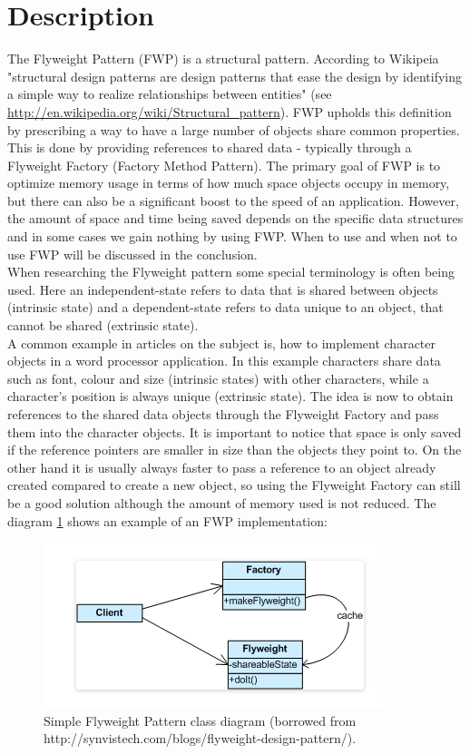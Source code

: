 \section{Description}
The Flyweight Pattern (FWP) is a structural pattern. According to Wikipeia "structural design patterns are design patterns that ease the design by identifying a simple way to realize relationships between entities" (see \url{http://en.wikipedia.org/wiki/Structural_pattern}). FWP upholds this definition by prescribing a way to have a large number of objects share common properties. This is done by providing references to shared data - typically through a Flyweight Factory (Factory Method Pattern). The primary goal of FWP is to optimize memory usage in terms of how much space objects occupy in memory, but there can also be a significant boost to the speed of an application. However, the amount of space and time being saved depends on the specific data structures and in some cases we gain nothing by using FWP. When to use and when not to use FWP will be discussed in the conclusion.\\

When researching the Flyweight pattern some special terminology is often being used. Here an independent-state refers to data that is shared between objects (intrinsic state) and a dependent-state refers to data unique to an object, that cannot be shared (extrinsic state).\\

A common example in articles on the subject is, how to implement character objects in a word processor application. In this example characters share data such as font, colour and size (intrinsic states) with other characters, while a character's position is always unique (extrinsic state). The idea is now to obtain references to the shared data objects through the Flyweight Factory and pass them into the character objects. It is important to notice that space is only saved if the reference pointers are smaller in size than the objects they point to. On the other hand it is usually always faster to pass a reference to an object already created compared to create a new object, so using the Flyweight Factory can still be a good solution although the amount of memory used is not reduced. The diagram \ref{fig:Flyweight Pattern} shows an example of an FWP implementation:

\begin{figure}[h]
	\centering
	\includegraphics[width=0.7\linewidth]{Content/Pattern_example.png}
	\caption{Simple Flyweight Pattern class diagram (borrowed from http://synvistech.com/blogs/flyweight-design-pattern/).}
	\label{fig:Flyweight Pattern}
\end{figure}

 